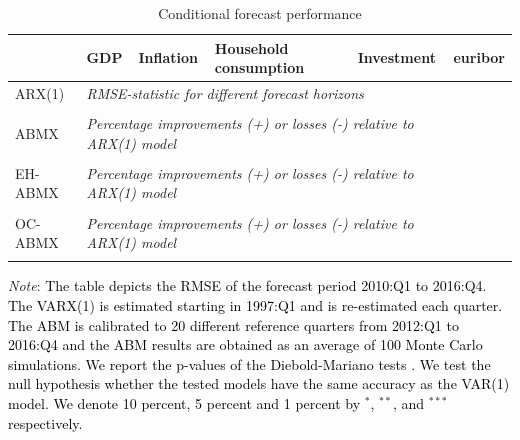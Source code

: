 \begin{table}[!h]
	\caption{Conditional forecast performance } 
	\label{table:rmse_ed_abmx}
	\centering
		\begin{tabular}{llllll}
			\toprule
			& GDP & Inflation & Household consumption & Investment & euribor\\
			\midrule
			ARX(1) & \multicolumn{4}{l}{\textit{RMSE-statistic for different forecast horizons}} \\ \midrule
			 \\ \midrule
           ABMX & \multicolumn{4}{l}{\textit{Percentage improvements (+) or losses (-) relative to ARX(1) model}} \\ \midrule
           	 \\ \midrule
           EH-ABMX & \multicolumn{4}{l}{\textit{Percentage improvements (+) or losses (-) relative to ARX(1) model}} \\ \midrule
			 \\ \midrule
			OC-ABMX & \multicolumn{4}{l}{\textit{Percentage improvements (+) or losses (-) relative to ARX(1) model}} \\ \midrule
			
			\\ \bottomrule
		\end{tabular}
	\begin{tablenotes}
		\footnotesize \item \textit{Note}: \textcolor{black}{The table depicts the RMSE of the forecast period 2010:Q1 to 201\textcolor{black}{6}:Q4. The VARX(1) is estimated starting in 1997:Q1 and is re-estimated each quarter. The ABM is calibrated to \textcolor{black}{20} different reference quarters from 2012:Q1 to \textcolor{black}{2016:Q4} and the ABM results are obtained as an average of 100 Monte Carlo simulations. We report the p-values of the Diebold-Mariano tests \citep{harveyTestingEqualityPrediction1997}.  We test the null hypothesis whether the tested models have the same accuracy as the VAR(1) model. We denote  10 percent, 5 percent and 1 percent by $^{*}$, $^{**}$, and $^{***}$ respectively.}
	\end{tablenotes}
\end{table}

